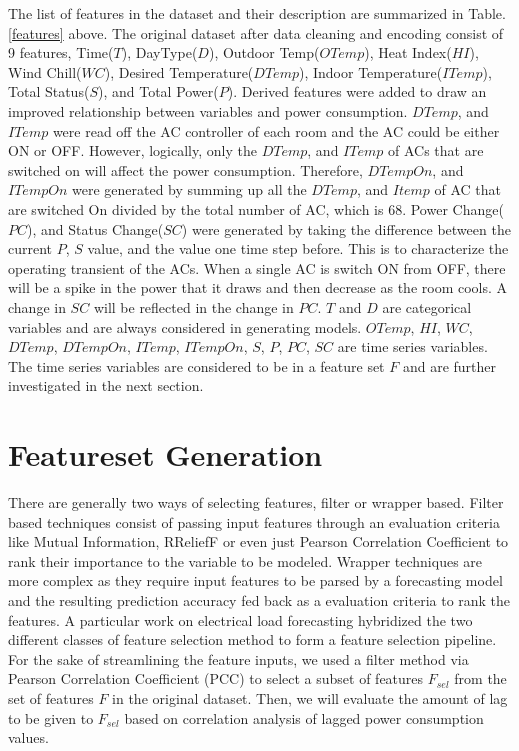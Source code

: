 \documentclass[conference]{IEEEtran}
\begin{document}
The list of features in the dataset and their description are summarized in Table. \ref{features} above. The original dataset after data cleaning and encoding consist of 9 features, Time($T$), DayType($D$), Outdoor Temp($OTemp$), Heat Index($HI$), Wind Chill($WC$), Desired Temperature($DTemp$), Indoor Temperature($ITemp$), Total Status($S$), and Total Power($P$). Derived features were added to draw an improved relationship between variables and power consumption. 
$DTemp$, and $ITemp$ were read off the AC controller of each room and the AC could be either ON or OFF. However, logically, only the $DTemp$, and $ITemp$ of ACs that are switched on will affect the power consumption. Therefore, $DTempOn$, and $ITempOn$ were generated by summing up all the $DTemp$, and $Itemp$ of AC that are switched On divided by the total number of AC, which is 68. Power Change($PC$), and Status Change($SC$) were generated by taking the difference between the current $P$, $S$ value, and the value one time step before. This is to characterize the operating transient of the ACs. When a single AC is switch ON from OFF, there will be a spike in the power that it draws and then decrease as the room cools. A change in $SC$ will be reflected in the change in $PC$. $T$ and $D$ are categorical variables and are always considered in generating models. $OTemp$, $HI$, $WC$, $DTemp$, $DTempOn$, $ITemp$, $ITempOn$, $S$, $P$, $PC$, $SC$ are time series variables. The time series variables are considered to be in a feature set $F$ and are further investigated in the next section. 

\section{Featureset Generation}\label{fgen}
 There are generally two ways of selecting features, filter or wrapper based. Filter based techniques consist of passing input features through an evaluation criteria like Mutual Information, RReliefF or even just Pearson Correlation Coefficient to rank their importance to the variable to be modeled. Wrapper techniques are more complex as they require input features to be parsed by a forecasting model and the resulting prediction accuracy fed back as a evaluation criteria to rank the features. A particular work on electrical load forecasting \cite{Hu201517} hybridized the two different classes of feature selection method to form a feature selection pipeline. For the sake of streamlining the feature inputs, we used a filter method via Pearson Correlation Coefficient (PCC) to select a subset of features $F_{sel}$ from the set of features $F$ in the original dataset. Then, we will evaluate the amount of lag to be given to $F_{sel}$ based on correlation analysis of lagged power consumption values. 
\end{document}
